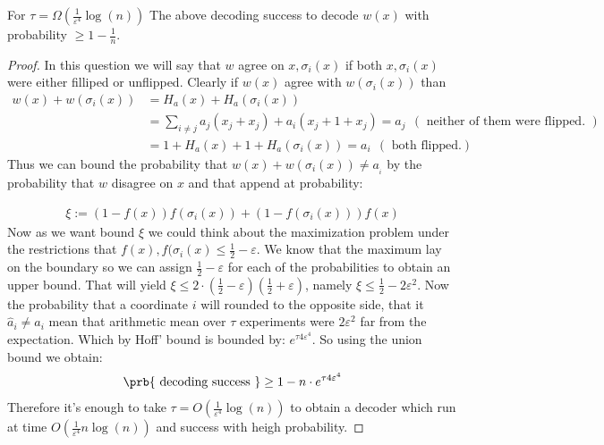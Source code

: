 \documentclass{article}
\begin{document}
\begin{claim}
  For $\tau = \Omega\left( \frac{1}{\varepsilon^{4}} \log\left( n \right) \right)$ The above decoding success to decode $w\left( x \right)$ with probability $\ge 1 - \frac{1}{n}$.
\end{claim}
\begin{proof}
  In this question we will say that $w$ agree on $x,\sigma_{i}(x)$ if both $x,\sigma_{i}(x)$ were either filliped or unflipped. Clearly if $w(x)$ agree with $w(\sigma_{i}(x))$ than  
  \begin{equation*}
    \begin{split}
      w\left( x \right) + w\left( \sigma_{i}(x) \right) & = H_{a}(x) + H_{a}(\sigma_{i}(x)) \\
      & = \sum_{i\neq j }{a_{j}(x_{j} + x_{j})} + a_{i}(x_{j} + 1 + x_{j})  = a_{j} \ \ ( \text{   neither of them were flipped. } ) \\
      & = 1 + H_{a}(x) + 1 + H_{a}(\sigma_{i}(x)) =  a_{i} \ \ (  \text{   both flipped.} )
    \end{split}
  \end{equation*}
  Thus we can bound the probability that $ w\left( x \right) + w\left( \sigma_{i}(x) \right) \neq a_{_i}$ by the probability that $w$ disagree on $x$ and that append at probability: 
  
  \begin{equation*}
    \begin{split}
     \xi := \left(1 - f(x)\right)f(\sigma_{i}(x)) + \left(1 - f(\sigma_{i}(x))\right)f(x)
    \end{split}
  \end{equation*}
  Now as we want bound $\xi$ we could think about the maximization problem under the restrictions that $f(x),f(\sigma_{i}(x) \le \frac{1}{2} - \varepsilon$. We know that the maximum lay on the boundary so we can assign $\frac{1}{2} - \varepsilon$ for each of the probabilities to obtain an upper bound. That will yield $\xi \le 2\cdot \left( \frac{1}{2} - \varepsilon \right)\left( \frac{1}{2} + \varepsilon \right)$, namely $\xi \le \frac{1}{2}- 2\varepsilon^{2}$. 
    Now the probability that a coordinate $i$ will rounded to the opposite side, that it $\hat{a}_{i} \neq a_{i}$ mean that arithmetic mean over $\tau$ experiments were $2\varepsilon^{2}$ far from the expectation. Which by Hoff' bound is bounded by: $e^{\tau 4\varepsilon^{4}}$. So using the union bound we obtain:     
    \begin{equation*}
      \begin{split}
        \prb{\text{ decoding success }} \ge 1 - n \cdot e^{\tau 4\varepsilon^{4}}
      \end{split}
    \end{equation*} 
    Therefore it's enough to take $\tau = O( \frac{1}{\varepsilon^{4}} \log(n)  )$ to obtain a decoder which run at time $O(  \frac{1}{\varepsilon^{4}} n \log(n))$ and success with heigh probability.   
\end{proof}
\end{document}
